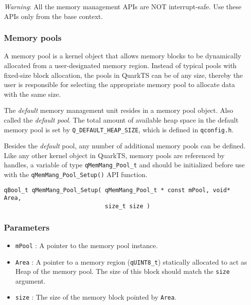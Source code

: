 \begin{tcolorbox}
\AsteriskBold \textit{Warning}: All the memory management APIs are NOT interrupt-safe. Use these APIs only from the base context.
\end{tcolorbox}

\subsubsection{Memory pools}

A memory pool is a kernel object that allows memory blocks to be dynamically allocated from a user-designated memory region. Instead of typical pools with fixed-size block allocation, the pools in QuarkTS can be of any size, thereby the user is responsible for selecting the appropriate memory pool to allocate data with the same size. 

The \textit{default} memory management unit resides in a memory pool object. Also called the \textit{default pool}. The total amount of available heap space in the default memory pool is set by \lstinline{Q_DEFAULT_HEAP_SIZE}, which is defined in \lstinline{qconfig.h}.

Besides the \textit{default} pool, any number of additional memory pools can be defined. Like any other kernel object in QuarkTS, memory pools are referenced by handles, a variable of type \lstinline{qMemMang_Pool_t}  and should be initialized before use with the \lstinline{qMemMang_Pool_Setup()}  API function.
\medskip

\begin{lstlisting}[style=CStyle]
qBool_t qMemMang_Pool_Setup( qMemMang_Pool_t * const mPool, void* Area, 
                             size_t size )
\end{lstlisting}

\subsubsection*{Parameters}
\begin{itemize}
    \item \lstinline{mPool} : A pointer to the memory pool instance. 
    \item \lstinline{Area} :  A pointer to a memory region (\lstinline{qUINT8_t}) statically allocated to act as Heap of the memory pool. The size of this block should match the \lstinline{size} argument.
    \item \lstinline{size} : The size of the memory block pointed by \lstinline{Area}. 
\end{itemize}

